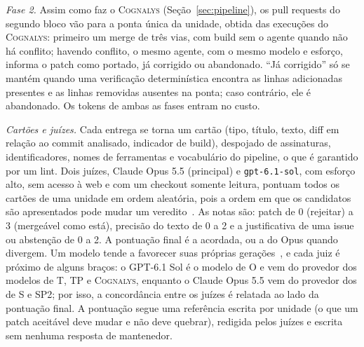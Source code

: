 \documentclass[conference]{IEEEtran}
\newcommand{\system}{\textsc{Cognalys}}
\begin{document}
\emph{Fase 2.} Assim como faz o {\system} (Seção~\ref{sec:pipeline}), os pull requests
do segundo bloco vão para a ponta única da unidade, obtida das execuções do {\system}:
primeiro um merge de três vias, com build sem o agente quando não há conflito; havendo conflito, o
mesmo agente, com o mesmo modelo e esforço, informa o patch como portado, já corrigido ou
abandonado. ``Já corrigido'' só se mantém quando uma verificação determinística encontra as
linhas adicionadas presentes e as linhas removidas ausentes na ponta; caso contrário, ele é
abandonado. Os tokens de ambas as fases entram no custo.

\emph{Cartões e juízes.} Cada entrega se torna um cartão (tipo, título, texto,
diff em relação ao commit analisado, indicador de build), despojado de assinaturas,
identificadores, nomes de ferramentas e vocabulário do pipeline, o que é garantido por um lint. Dois
juízes, Claude Opus 5.5 (principal) e \texttt{gpt-6.1-sol}, com esforço alto,
sem acesso à web e com um checkout somente leitura, pontuam todos os cartões de uma unidade em
ordem aleatória, pois a ordem em que os candidatos são apresentados pode mudar
um veredito~\cite{wang2024fair}. As notas são: patch de 0 (rejeitar) a 3 (mergeável como
está), precisão do texto de 0 a 2 e a justificativa de uma issue ou abstenção
de 0 a 2. A pontuação final é a acordada, ou a do Opus quando divergem. Um
modelo tende a favorecer suas próprias gerações~\cite{panickssery2024selfpref},
e cada juiz é próximo de alguns braços: o GPT-6.1 Sol é o modelo de O e vem do
provedor dos modelos de T, TP e {\system}, enquanto o Claude Opus 5.5 vem do
provedor dos de S e SP2; por isso, a concordância entre os juízes é relatada
ao lado da pontuação final. A pontuação segue uma
referência escrita por unidade (o que um patch aceitável deve mudar e não deve
quebrar), redigida pelos juízes e escrita sem nenhuma resposta de mantenedor.
\end{document}
